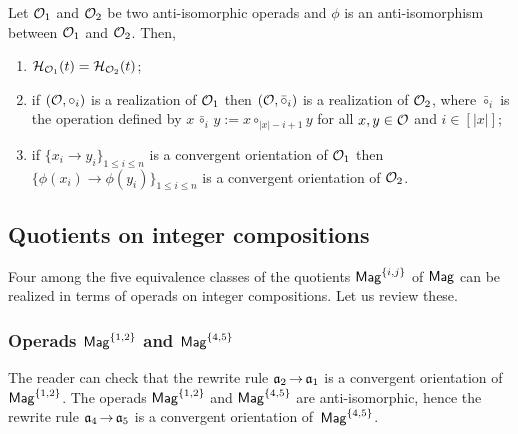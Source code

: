 \begin{Proposition} \label{prop:recall_anti_isomorphic}
    Let $\mathcal{O}_1$ and $\mathcal{O}_2$ be two anti-isomorphic operads and $\phi$
    is an anti-isomorphism between $\mathcal{O}_1$ and $\mathcal{O}_2$. Then,
    \begin{enumerate}[label={(\it\roman*)}]
        \item $\mathcal{H}_{\mathcal{O}_1}(t) = \mathcal{H}_{\mathcal{O}_2}(t)$;
        \item if $\left(\mathcal{O}, \circ_i\right)$ is a realization of
        $\mathcal{O}_1$ then
        \begin{math}
            \left(\mathcal{O}, \bar{\circ}_i\right)
        \end{math}
        is a realization of $\mathcal{O}_2$, where $\bar{\circ}_i$ is the
        operation defined by
        \begin{math}
            x \, \bar{\circ}_i \, y := x \circ_{|x| - i + 1} y
        \end{math}
        for all $x, y \in \mathcal{O}$ and $i \in [|x|]$;
        \item if $\{ x_i \rightarrow y_i \}_{1 \leq i \leq n}$ is a
        convergent orientation of $\mathcal{O}_1$ then
        $\{ \phi\left(x_i\right) \rightarrow
        \phi\left(y_i\right) \}_{1 \leq i \leq n}$ is a convergent
        orientation of $\mathcal{O}_2$.
    \end{enumerate}
\end{Proposition}
\medbreak


\subsection{Quotients on integer compositions}
Four among the five equivalence classes of the quotients
$\mathsf{Mag}^{\{i, j\}}$ of $\mathsf{Mag}$ can be realized in terms of operads on
integer compositions. Let us review these.
\medbreak

\subsubsection{Operads $\mathsf{Mag}^{\{1, 2\}}$ and $\mathsf{Mag}^{\{4, 5\}}$}
\label{subsubsec:Mag_1_2}
The reader can check that the rewrite rule $\mathfrak{a}_2 \operatorname{\to} \mathfrak{a}_1$ is a
convergent orientation of $\mathsf{Mag}^{\{1, 2\}}$. The operads
$\mathsf{Mag}^{\{1, 2\}}$ and $\mathsf{Mag}^{\{4, 5\}}$ are anti-isomorphic, hence the
rewrite rule $\mathfrak{a}_4 \operatorname{\to} \mathfrak{a}_5$ is a convergent orientation
of~$\mathsf{Mag}^{\{4, 5\}}$.
\medbreak

